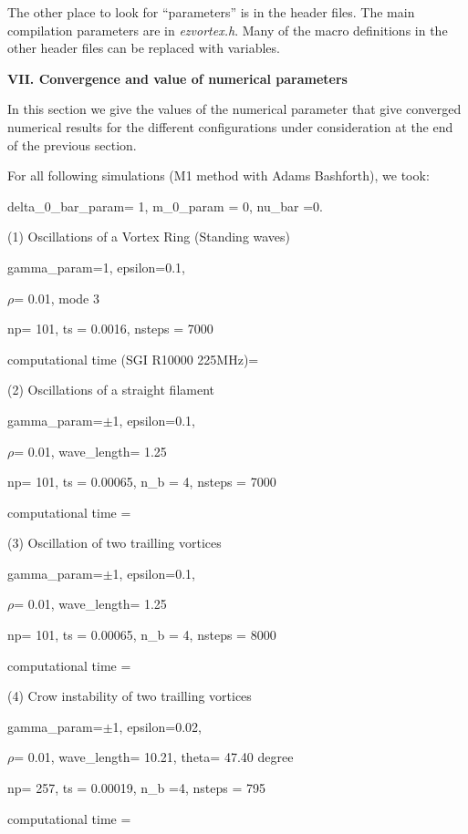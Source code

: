 The other place to look for ``parameters'' is in the header files.
The main compilation parameters are in {\em ezvortex.h}.   Many of the macro
definitions in the other header files can be replaced with variables.

\medskip
{\bf VII.  Convergence and value of numerical parameters } 
\smallskip

  In this section we give the values of the numerical parameter that give converged numerical results for the different configurations under consideration at the end of the previous section.

    For all following simulations (M1 method with Adams Bashforth), we took:

 {\sf delta\_0\_bar\_param}= 1, {\sf m\_0\_param} = 0, {\sf nu\_bar} =0.
\begin{list}{dummy}
{\partopsep=-10pt\parsep=-10pt\itemsep=12pt}

\item[(1)] Oscillations of a Vortex Ring (Standing waves)

{\sf gamma\_param}=1, {\sf epsilon}=0.1, 

{\sf $\rho$}= 0.01, mode 3

{\sf np}= 101, {\sf ts} = 0.0016,  {\sf nsteps} = 7000 

computational time (SGI R10000 225MHz)= 
\item[(2)] Oscillations of a straight filament

{\sf gamma\_param}=$\pm$1, {\sf epsilon}=0.1, 

{\sf $\rho$}= 0.01, {\sf wave\_length}= 1.25

{\sf np}= 101, {\sf ts} = 0.00065, {\sf n\_b} = 4,  {\sf nsteps} = 7000

computational time = 
\item[(3)] Oscillation of two trailling vortices

{\sf gamma\_param}=$\pm$1, {\sf epsilon}=0.1, 


{\sf $\rho$}= 0.01, {\sf wave\_length}= 1.25

{\sf np}= 101, {\sf ts} = 0.00065, {\sf n\_b} = 4,  {\sf nsteps} = 8000

computational time = 
\item[(4)] Crow instability  of two trailling vortices

{\sf gamma\_param}=$\pm$1, {\sf epsilon}=0.02, 

{\sf $\rho$}= 0.01, {\sf wave\_length}= 10.21, {\sf theta}= 47.40 degree

{\sf np}= 257, {\sf ts} = 0.00019, {\sf n\_b} =4,  {\sf nsteps} = 795

computational time = 
\end{list} 



